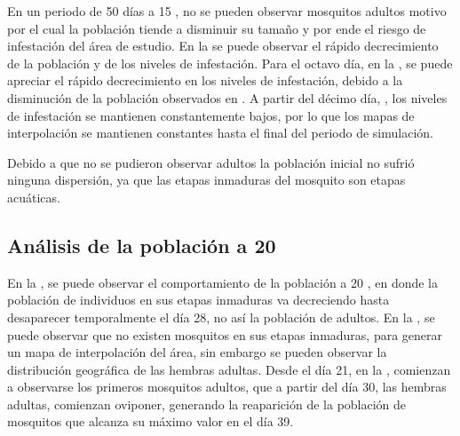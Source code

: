En un periodo de 50 días a 15 \textcelsius, no se pueden observar mosquitos adultos motivo por el
cual la población tiende a disminuir su tamaño y por ende el riesgo de infestación del área de
estudio. En la  se puede observar el rápido decrecimiento de la
población y de los niveles de infestación. Para el octavo día, en la
, se puede apreciar el rápido decrecimiento en los niveles de
infestación, debido a la disminución de la población observados en
. A partir del décimo día,
, los niveles de infestación se mantienen constantemente
bajos, por lo que los mapas de interpolación se mantienen constantes hasta el final del periodo de
simulación.

Debido a que no se pudieron observar adultos la población inicial no sufrió ninguna dispersión, ya
que las etapas inmaduras del mosquito son etapas acuáticas.

\subsection{Análisis de la población a 20\textcelsius}
En la , se puede observar el comportamiento de la población a
20 \textcelsius, en donde la población de individuos en sus etapas inmaduras va decreciendo hasta
desaparecer temporalmente el día 28, no así la población de adultos. En la
, se puede observar que no existen mosquitos en sus etapas
inmaduras, para generar un mapa de interpolación del área, sin embargo se pueden observar la
distribución geográfica de las hembras adultas. Desde el día 21, en la
, comienzan a observarse los primeros mosquitos adultos, que a
partir del día 30, las hembras adultas, comienzan oviponer, generando la reaparición de la
población de mosquitos que alcanza su máximo valor en el día 39.

